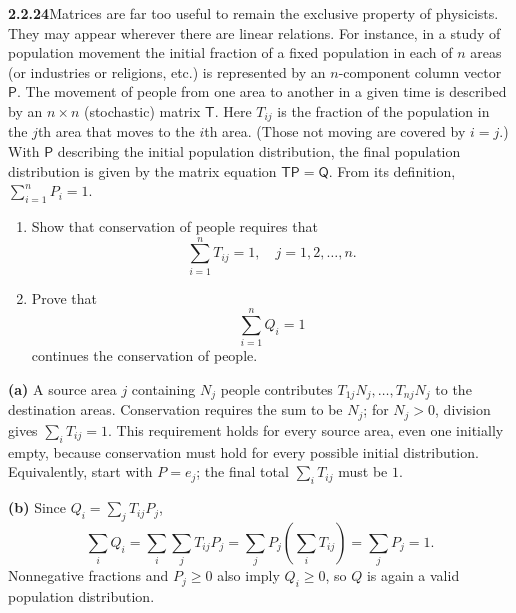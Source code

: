 \par\bigskip
\noindent\textbf{2.2.24}\quad Matrices are far too useful to remain the
exclusive property of physicists. They may appear wherever there are linear
relations. For instance, in a study of population movement the initial
fraction of a fixed population in each of $n$ areas (or industries or
religions, etc.) is represented by an $n$-component column vector
$\mathsf{P}$. The movement of people from one area to another in a given time
is described by an $n\times n$ (stochastic) matrix $\mathsf{T}$. Here
$T_{ij}$ is the fraction of the population in the $j$th area that moves to the
$i$th area. (Those not moving are covered by $i=j$.) With $\mathsf{P}$
describing the initial population distribution, the final population
distribution is given by the matrix equation $\mathsf{TP}=\mathsf{Q}$. From
its definition, $\sum_{i=1}^{n}P_{i}=1$.
\begin{enumerate}
\item[(a)] Show that conservation of people requires that
  \[
  \sum_{i=1}^{n}T_{ij}=1,\quad j=1,2,\ldots,n.
  \]
\item[(b)] Prove that
  \[
  \sum_{i=1}^{n}Q_{i}=1
  \]
  continues the conservation of people.
\end{enumerate}
\solution
\textbf{(a)} A source area $j$ containing $N_j$ people contributes
$T_{1j}N_j,\ldots,T_{nj}N_j$ to the destination areas.
Conservation requires the sum to be $N_j$; for $N_j>0$, division
gives $\sum_iT_{ij}=1$. This requirement holds for every source
area, even one initially empty, because conservation must hold for
every possible initial distribution. Equivalently, start with $P=e_j$;
the final total $\sum_iT_{ij}$ must be $1$.

\textbf{(b)} Since $Q_i=\sum_jT_{ij}P_j$,
\[
\sum_iQ_i=\sum_i\sum_jT_{ij}P_j
=\sum_jP_j\left(\sum_iT_{ij}\right)=\sum_jP_j=1.
\]
Nonnegative fractions and $P_j\ge0$ also imply $Q_i\ge0$, so $Q$
is again a valid population distribution.

